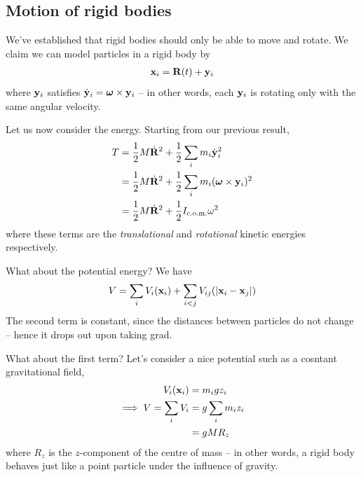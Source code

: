 \documentclass{../../template/note}
\begin{document}
    \subsection{Motion of rigid bodies}

    We've established that rigid bodies should only be able to move and rotate. We claim we can model particles in a rigid body by
    \begin{align*}
        \V x_i = \V R(t) + \V y_i
    \end{align*}
    where \(\V y_i\) satisfies \(\dot{\V y}_i = \V \omega \times \V y_i\) -- in other words, each \(\V y_i\) is rotating only with the same angular velocity.
    
    Let us now consider the energy. Starting from our previous result,
    \begin{align*}
        T &= \frac 1 2 M \dot{\V R}^2 + \frac 1 2 \sum_i m_i \dot{\V y}_i^2 \\
        &= \frac 1 2 M \dot{\V R}^2 + \frac 1 2 \sum_i m_i (\V \omega \times \V y_i)^2 \\
        &= \frac 1 2 M \dot{\V R}^2 + \frac 1 2 I_\text{c.o.m.}\omega^2
    \end{align*}
    where these terms are the \emph{translational} and \emph{rotational} kinetic energies respectively.
    
    What about the potential energy? We have
    \begin{align*}
        V = \sum_i V_i(\V x_i) + \sum_{i < j}V_{ij}(|\V x_i - \V x_j|)
    \end{align*}
    The second term is constant, since the distances between particles do not change -- hence it drops out upon taking grad.

    What about the first term? Let's consider a nice potential such as a cosntant gravitational field,
    \begin{align*}
        V_i(\V x_i) &= m_igz_i \\
        \implies V = \sum_i V_i &= g \sum_i m_iz_i \\
        &= gMR_z
    \end{align*}
    where \(R_z\) is the \(z\)-component of the centre of mass -- in other words, a rigid body behaves just like a point particle under the influence of gravity.
\end{document}
